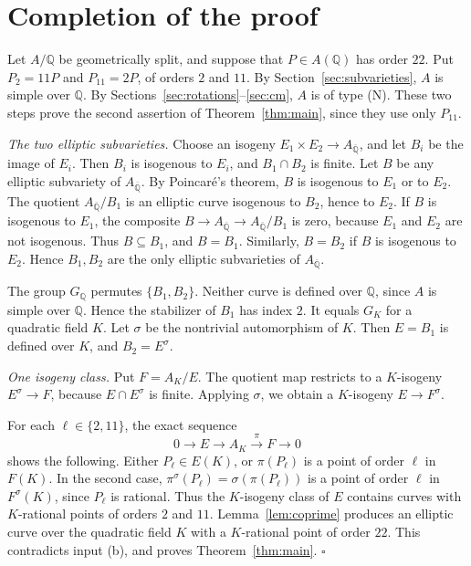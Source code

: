 \documentclass[11pt]{article}
\theoremstyle{remark}
\newcommand{\Q}{\mathbb Q}
\begin{document}
\section{Completion of the proof}\label{sec:completion}

Let \(A/\Q\) be geometrically split, and suppose that \(P\in A(\Q)\)
has order \(22\). Put \(P_2=11P\) and \(P_{11}=2P\), of orders \(2\)
and \(11\). By Section~\ref{sec:subvarieties}, \(A\) is simple over
\(\Q\). By Sections~\ref{sec:rotations}--\ref{sec:cm}, \(A\) is of type
(N). These two steps prove the second assertion of
Theorem~\ref{thm:main}, since they use only \(P_{11}\).

\emph{The two elliptic subvarieties.} Choose an isogeny
\(E_1\times E_2\to A_{\overline{\Q}}\), and let \(B_i\) be the image of
\(E_i\). Then \(B_i\) is isogenous to \(E_i\), and \(B_1\cap B_2\) is
finite. Let \(B\) be any elliptic subvariety of
\(A_{\overline{\Q}}\). By Poincar\'e's theorem, \(B\) is isogenous to
\(E_1\) or to \(E_2\). The quotient \(A_{\overline{\Q}}/B_1\) is an
elliptic curve isogenous to \(B_2\), hence to \(E_2\). If \(B\) is
isogenous to \(E_1\), the composite
\(B\to A_{\overline{\Q}}\to A_{\overline{\Q}}/B_1\) is zero, because
\(E_1\) and \(E_2\) are not isogenous. Thus \(B\subseteq B_1\), and
\(B=B_1\). Similarly, \(B=B_2\) if \(B\) is isogenous to \(E_2\). Hence
\(B_1,B_2\) are the only elliptic subvarieties of
\(A_{\overline{\Q}}\).

The group \(G_{\Q}\) permutes \(\{B_1,B_2\}\). Neither curve is defined
over \(\Q\), since \(A\) is simple over \(\Q\). Hence the stabilizer of
\(B_1\) has index \(2\). It equals \(G_K\) for a quadratic field \(K\).
Let \(\sigma\) be the nontrivial automorphism of \(K\). Then
\(E=B_1\) is defined over \(K\), and \(B_2=E^\sigma\).

\emph{One isogeny class.} Put \(F=A_K/E\). The quotient map restricts
to a \(K\)-isogeny \(E^\sigma\to F\), because \(E\cap E^\sigma\) is
finite. Applying \(\sigma\), we obtain a \(K\)-isogeny
\(E\to F^\sigma\).

For each \(\ell\in\{2,11\}\), the exact sequence
\[
 0\longrightarrow E\longrightarrow A_K\xrightarrow{\ \pi\ }F
 \longrightarrow0
\]
shows the following. Either \(P_\ell\in E(K)\), or \(\pi(P_\ell)\) is a
point of order \(\ell\) in \(F(K)\). In the second case,
\(\pi^\sigma(P_\ell)=\sigma(\pi(P_\ell))\) is a point of order \(\ell\)
in \(F^\sigma(K)\), since \(P_\ell\) is rational. Thus the
\(K\)-isogeny class of \(E\) contains curves with \(K\)-rational points
of orders \(2\) and \(11\). Lemma~\ref{lem:coprime} produces an
elliptic curve over the quadratic field \(K\) with a \(K\)-rational
point of order \(22\). This contradicts input (b), and proves
Theorem~\ref{thm:main}.
\hfill\(\square\)
\end{document}
